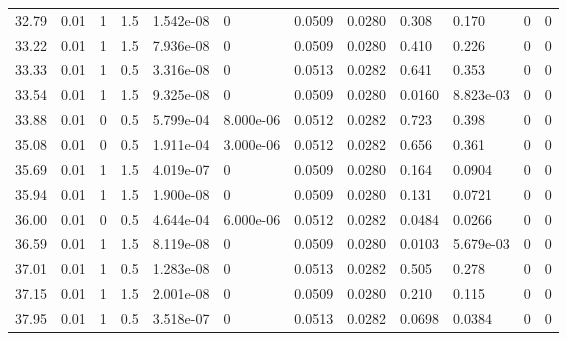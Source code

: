 \documentclass[preview]{standalone}
\begin{document}
{{{\begin{tabular}{L{1.2cm}C{1.2cm} C{0.3cm}C{0.5cm} C{1.4cm}C{1.4cm} C{1.4cm}C{1.4cm} C{1.6cm}C{1.6cm} C{1.6cm}C{1.6cm}}
  32.79  &  0.01  & 1     & 1.5 &  1.542e-08  & 0  &  0.0509&   0.0280& 0.308 & 0.170   &  0 & 0  \\ 
  33.22  &  0.01  & 1     & 1.5 &  7.936e-08  & 0  &  0.0509&   0.0280& 0.410 & 0.226   &  0 & 0  \\ 
  33.33  &  0.01  & 1     & 0.5 &  3.316e-08  & 0  &  0.0513&   0.0282& 0.641 & 0.353   &  0 & 0  \\ 
  33.54  &  0.01  & 1     & 1.5 &  9.325e-08  & 0  &  0.0509&   0.0280& 0.0160 & 8.823e-03   &  0 & 0  \\ 
  33.88  &  0.01  & 0     & 0.5 &  5.799e-04  & 8.000e-06  &  0.0512&   0.0282& 0.723 & 0.398   &  0 & 0  \\ 
  35.08  &  0.01  & 0     & 0.5 &  1.911e-04  & 3.000e-06  &  0.0512&   0.0282& 0.656 & 0.361   &  0 & 0  \\ 
  35.69  &  0.01  & 1     & 1.5 &  4.019e-07  & 0  &  0.0509&   0.0280& 0.164 & 0.0904   &  0 & 0  \\ 
  35.94  &  0.01  & 1     & 1.5 &  1.900e-08  & 0  &  0.0509&   0.0280& 0.131 & 0.0721   &  0 & 0  \\ 
  36.00  &  0.01  & 0     & 0.5 &  4.644e-04  & 6.000e-06  &  0.0512&   0.0282& 0.0484 & 0.0266   &  0 & 0  \\ 
  36.59  &  0.01  & 1     & 1.5 &  8.119e-08  & 0  &  0.0509&   0.0280& 0.0103 & 5.679e-03   &  0 & 0  \\ 
  37.01  &  0.01  & 1     & 0.5 &  1.283e-08  & 0  &  0.0513&   0.0282& 0.505 & 0.278   &  0 & 0  \\ 
  37.15  &  0.01  & 1     & 1.5 &  2.001e-08  & 0  &  0.0509&   0.0280& 0.210 & 0.115   &  0 & 0  \\ 
  37.95  &  0.01  & 1     & 0.5 &  3.518e-07  & 0  &  0.0513&   0.0282& 0.0698 & 0.0384   &  0 & 0  \\ 
\hline 
\end{tabular} 

}}}
\end{document}
